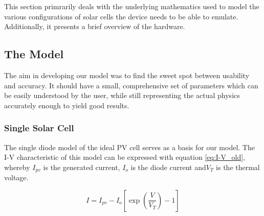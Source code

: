
This section  primrarily deals with  the underlying mathematics used  to model
the  various configurations  of solar  cells the  device needs  to be  able to
emulate. Additionally, it presents a brief overview of the hardware.

\subsection{The Model}

The aim in developing  our model was to find the  sweet spot between usability
and  accuracy. It  should  have  a  small,  comprehensive  set  of  parameters
which  can be  easily understood  by the  user, while  still representing  the
actual physics  accurately enough to  yield good results.


\subsubsection{Single Solar Cell}

\begin{minipage}{0.6\textwidth}
    The single diode model of the ideal PV cell\cite{ref:villa:pvmodel} serves
    as  a basis  for our  model.   The I-V  characteristic of  this model  can
    be  expressed  with equation  \ref{eq:I-V_old},  whereby  $I_{pv}$ is  the
    generated current,  $I_o$ is the  diode current  and$ V_T$ is  the thermal
    voltage.
\end{minipage}
\begin{minipage}{0.4\textwidth}
    \begin{equation} \label{eq:I-V_old}
        I = I_{pv} - I_o \left[ \exp \left( \frac{V}{V_T} \right) - 1 \right]
    \end{equation}
\end{minipage}

